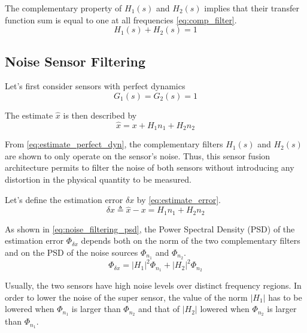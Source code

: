 \documentclass[conference]{IEEEtran}
\begin{document}
The complementary property of \(H_1(s)\) and \(H_2(s)\) implies that their transfer function sum is equal to one at all frequencies \eqref{eq:comp_filter}.
\begin{equation}
\label{eq:comp_filter}
  H_1(s) + H_2(s) = 1
\end{equation}

\subsection{Noise Sensor Filtering}
\label{sec:org76c0d7c}
\label{sec:noise_filtering}

Let's first consider sensors with perfect dynamics
\begin{equation}
\label{eq:perfect_dynamics}
  G_1(s) = G_2(s) = 1
\end{equation}

The estimate \(\hat{x}\) is then described by
\begin{equation}
\label{eq:estimate_perfect_dyn}
  \hat{x} = x + H_1 n_1 + H_2 n_2
\end{equation}

From \eqref{eq:estimate_perfect_dyn}, the complementary filters \(H_1(s)\) and \(H_2(s)\) are shown to only operate on the sensor's noise.
Thus, this sensor fusion architecture permits to filter the noise of both sensors without introducing any distortion in the physical quantity to be measured.

Let's define the estimation error \(\delta x\) by \eqref{eq:estimate_error}.
\begin{equation}
\label{eq:estimate_error}
  \delta x \triangleq \hat{x} - x = H_1 n_1 + H_2 n_2
\end{equation}

As shown in \eqref{eq:noise_filtering_psd}, the Power Spectral Density (PSD) of the estimation error \(\Phi_{\delta x}\) depends both on the norm of the two complementary filters and on the PSD of the noise sources \(\Phi_{n_1}\) and \(\Phi_{n_2}\).
\begin{equation}
\label{eq:noise_filtering_psd}
  \Phi_{\delta x} = \left|H_1\right|^2 \Phi_{n_1} + \left|H_2\right|^2 \Phi_{n_2}
\end{equation}

Usually, the two sensors have high noise levels over distinct frequency regions.
In order to lower the noise of the super sensor, the value of the norm \(|H_1|\) has to be lowered when \(\Phi_{n_1}\) is larger than \(\Phi_{n_2}\) and that of \(|H_2|\) lowered when \(\Phi_{n_2}\) is larger than \(\Phi_{n_1}\).
\end{document}
